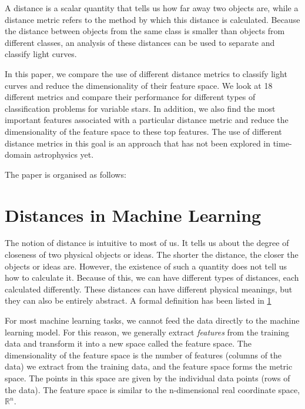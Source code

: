 \documentclass[conference]{IEEEtran}
\begin{document}
A distance is a scalar quantity that tells us how far away two objects are, while a distance metric refers to the method by which this distance is calculated. Because the distance between objects from the same class is smaller than objects from different classes, an analysis of these distances can be used to separate and classify light curves.

In this paper, we compare the use of different distance metrics to classify light curves and reduce the dimensionality of their feature space. We look at 18 different metrics and compare their performance for different types of classification problems for variable stars. In addition, we also find the most important features associated with a particular distance metric and reduce the dimensionality of the feature space to these top features. The use of different distance metrics in this goal is an approach that has not been explored in time-domain astrophysics yet.

The paper is organised as follows: %


\section{Distances in Machine Learning}
The notion of distance is intuitive to most of us. It tells us about the degree of closeness of two physical objects or ideas. The shorter the distance, the closer the objects or ideas are. However, the existence of such a quantity does not tell us how to calculate it. Because of this, we can have different types of distances, each calculated differently. These distances can have different physical meanings, but they can also be entirely abstract. A formal definition has been listed in \ref{}

For most machine learning tasks, we cannot feed the data directly to the machine learning model. For this reason, we generally extract \emph{features} from the training data and transform it into a new space called the feature space. The dimensionality of the feature space is the number of features (columns of the data) we extract from the training data, and the feature space forms the metric space. The points in this space are given by the individual data points (rows of the data). The feature space is similar to the n-dimensional real coordinate space, $\mathbb{R}^n$.
\end{document}
